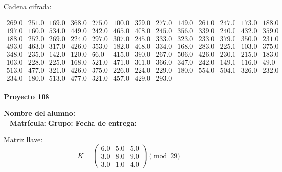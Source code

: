 \documentclass[12pt]{article}
\begin{document}
Cadena cifrada:
\begin{center}
$\begin{array}{lllllllllllll}
269.0 & 251.0 & 169.0 & 368.0 & 275.0 & 100.0 & 329.0 & 277.0 & 149.0 & 261.0 & 247.0 & 173.0 & 188.0\\
197.0 & 160.0 & 534.0 & 449.0 & 242.0 & 465.0 & 408.0 & 245.0 & 356.0 & 339.0 & 240.0 & 432.0 & 359.0\\
188.0 & 252.0 & 269.0 & 224.0 & 297.0 & 307.0 & 245.0 & 333.0 & 323.0 & 233.0 & 379.0 & 350.0 & 231.0\\
493.0 & 463.0 & 317.0 & 426.0 & 353.0 & 182.0 & 408.0 & 334.0 & 168.0 & 283.0 & 225.0 & 103.0 & 375.0\\
348.0 & 235.0 & 142.0 & 120.0 & 66.0 & 415.0 & 390.0 & 267.0 & 506.0 & 426.0 & 230.0 & 215.0 & 183.0\\
103.0 & 228.0 & 225.0 & 168.0 & 521.0 & 471.0 & 301.0 & 366.0 & 347.0 & 242.0 & 149.0 & 116.0 & 49.0\\
513.0 & 477.0 & 321.0 & 426.0 & 375.0 & 226.0 & 224.0 & 229.0 & 180.0 & 554.0 & 504.0 & 326.0 & 232.0\\
234.0 & 180.0 & 513.0 & 477.0 & 321.0 & 457.0 & 429.0 & 293.0\\
\end{array}$
\end{center}

\newpage


\textbf{Proyecto 108}

\textbf{Nombre del alumno:} \underline{\hspace{13cm}}\\\
\vspace{1cm}
\textbf{Matrícula:} \underline{\hspace{4cm}} \hspace{1cm}
\textbf{Grupo:} \underline{\hspace{2cm}}
\textbf{Fecha de entrega:} \underline{\hspace{2cm}}

\medskip

Matriz llave:
\[
K = \begin{pmatrix}
6.0 & 5.0 & 5.0\\
3.0 & 8.0 & 9.0\\
3.0 & 1.0 & 4.0
\end{pmatrix} \pmod{29}
\]
\end{document}
